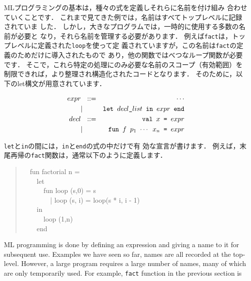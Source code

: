 \documentclass{jbook}
\newif\ifjp
\newcommand{\myem}{\mbox{\ \ }}
\begin{document}
\ifjp%
	MLプログラミングの基本は，種々の式を定義しそれらに名前を付け組み
合わせていくことです．
	これまで見てきた例では，名前はすべてトップレベルに記録されていま
した．
	しかし，大きなプログラムでは，一時的に使用する多数の名前が必要と
なり，それら名前を管理する必要があります．
	例えば{\tt fact}は，トップレベルに定義された{\tt loop}を使って定
義されていますが，この名前は{\tt fact}の定義のためだけに導入されたもので
あり，他の関数ではべつなループ関数が必要です．
	そこで，これら特定の処理にのみ必要な名前のスコープ（有効範囲）を
制限できれば，より整理され構造化されたコードとなります．
	そのために，以下のlet構文が用意されています．
\begin{tt}
\begin{eqnarray*}
expr &\mbox{\ \ }::=& \cdots \\
     &|& \mbox{\tt let\ $decl\_list$\ in\ $expr$\ end}
\\
decl &\mbox{\ \ }::=& \mbox{\tt val\ $x$ = $expr$}
\\
     &|& \mbox{\tt fun\ $f$\ $p_1$ $\cdots$ $x_n$ =  $expr$}
\end{eqnarray*}
\end{tt}
	{\tt let}と{\tt in}の間には，{\tt in}と{\tt end}の式の中だけで有
効な宣言が書けます．
	例えば，末尾再帰の{\tt fact}関数は，通常以下のように定義します．
\begin{tt}
\begin{quote}
\myem  fun factorial n =
\\\myem\myem    let
\\\myem\myem\myem      fun loop (s,0) = s
\\\myem\myem\myem\ \         | loop (s, i) = loop(s * i, i - 1)
\\\myem\myem    in
\\\myem\myem\myem      loop (1,n)
\\\myem\myem    end
\end{quote}
\end{tt}
\else%
	ML programming is done by defining an expression and giving a
name to it for subsequent use.
	Examples we have seen so far, names are all recorded at the
top-level.
	However, a large program requires a large number of names, many
of which are only temporarily used.
	For example, {\tt fact} function in the previous section is
\end{document}
